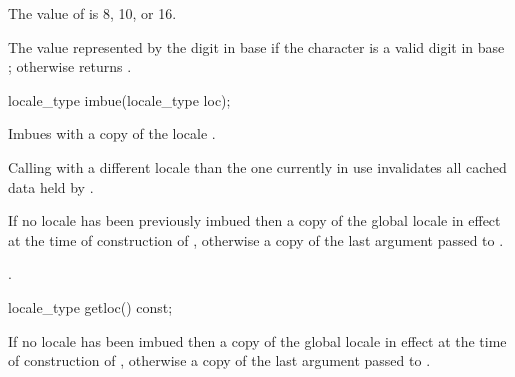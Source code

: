 \begin{itemdescr}
\pnum
\expects
The value of  is 8, 10, or 16.

\pnum
\returns
The value represented by the digit  in base
 if the character  is a valid digit in base
; otherwise returns .
\end{itemdescr}

%
%
\begin{itemdecl}
locale_type imbue(locale_type loc);
\end{itemdecl}

\begin{itemdescr}
\pnum
\effects
Imbues  with a copy of the
locale .
\begin{note}
Calling  with a
different locale than the one currently in use invalidates all cached
data held by .
\end{note}

\pnum
\returns
If no locale has been previously imbued then a copy of the
global locale in effect at the time of construction of ,
otherwise a copy of the last argument passed to .

\pnum
\ensures
{}.
\end{itemdescr}

%
%
\begin{itemdecl}
locale_type getloc() const;
\end{itemdecl}

\begin{itemdescr}
\pnum
\returns
If no locale has been imbued then a copy of the global locale
in effect at the time of construction of , otherwise a copy of
the last argument passed to .
\end{itemdescr}

